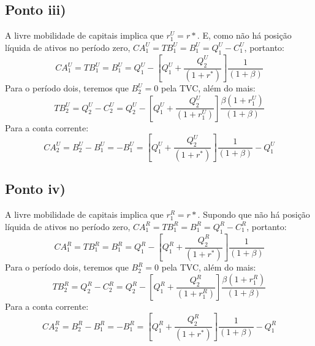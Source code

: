 \documentclass{article}
\begin{document}
\subsection*{Ponto iii)}
A livre mobilidade de capitais implica que $r_1^U=r*$. E, como não há posição líquida de ativos no período zero, $CA_1^U = TB_1^U = B_1^{U} = Q_1^U-C_1^U$, portanto:
\begin{equation}\label{eq:33ca1}
    CA_1^U = TB_1^U = B_1^{U} = Q_1^{U}-\left[Q_1^{U}+\frac{Q_2^{U}}{(1+r^*)}\right]\frac{1}{(1+\beta)}
\end{equation}
Para o período dois, teremos que $B_2^U=0$ pela TVC, além do mais:
\begin{equation}
    TB_2^U = Q_2^U - C_2^U = Q_2^U - \left[Q_1^{U}+\frac{Q_2^{U}}{(1+r_1^U)}\right]\frac{\beta(1+r_1^U)}{(1+\beta)}
\end{equation}
Para a conta corrente:
\begin{equation}
    CA_2^U = B_2^U - B_1^U = -B_1^U = \left[Q_1^{U}+\frac{Q_2^{U}}{(1+r^*)}\right]\frac{1}{(1+\beta)}-Q_1^{U}
\end{equation}

\subsection*{Ponto iv)}
A livre mobilidade de capitais implica que $r_1^R=r*$. Supondo que não há posição líquida de ativos no período zero, $CA_1^R = TB_1^R = B_1^{R} = Q_1^R-C_1^R$, portanto:
\begin{equation}
    CA_1^R = TB_1^R = B_1^{R} = Q_1^{R}-\left[Q_1^{R}+\frac{Q_2^{R}}{(1+r^*)}\right]\frac{1}{(1+\beta)}
\end{equation}
Para o período dois, teremos que $B_2^R=0$ pela TVC, além do mais:
\begin{equation}
    TB_2^R = Q_2^R - C_2^R = Q_2^R - \left[Q_1^{R}+\frac{Q_2^{R}}{(1+r_1^R)}\right]\frac{\beta(1+r_1^R)}{(1+\beta)}
\end{equation}
Para a conta corrente:
\begin{equation}
    CA_2^R = B_2^R - B_1^R = -B_1^R = \left[Q_1^{R}+\frac{Q_2^{R}}{(1+r^*)}\right]\frac{1}{(1+\beta)}-Q_1^{R}
\end{equation}
\end{document}
